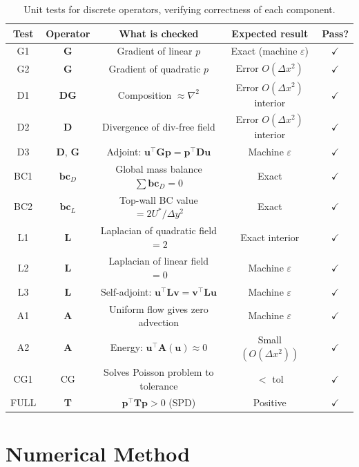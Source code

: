 \documentclass[
  aapm,
  amsmath,amssymb,
  reprint,          %
  floatfix
]{revtex4-2}
\begin{document}
\begin{table}[ht]
\centering
\caption{Unit tests for discrete operators, verifying correctness of each component.}
\begin{tabular}{ccccc}
\hline
Test & Operator & What is checked & Expected result & Pass? \\
\hline
G1 & \textbf{G} & Gradient of linear $p$ & Exact (machine $\varepsilon$) & $\checkmark$ \\
G2 & \textbf{G} & Gradient of quadratic $p$ & Error $O(\Delta x^2)$ & $\checkmark$ \\
D1 & \textbf{DG} & Composition $\approx \nabla^2$ & Error $O(\Delta x^2)$ interior & $\checkmark$ \\
D2 & \textbf{D} & Divergence of div-free field & Error $O(\Delta x^2)$ interior & $\checkmark$ \\
D3 & \textbf{D}, \textbf{G} & Adjoint: $\boldsymbol{u}^\top \textbf{G} \boldsymbol{p} = \boldsymbol{p}^\top \textbf{D} \boldsymbol{u}$ & Machine $\varepsilon$ & $\checkmark$ \\
BC1 & $\mathbf{bc}_D$ & Global mass balance $\sum \mathbf{bc}_D = 0$ & Exact & $\checkmark$ \\
BC2 & $\mathbf{bc}_L$ & Top-wall BC value $= 2U^*/\Delta y^2$ & Exact & $\checkmark$ \\
L1 & \textbf{L} & Laplacian of quadratic field $= 2$ & Exact interior & $\checkmark$ \\
L2 & \textbf{L} & Laplacian of linear field $= 0$ & Machine $\varepsilon$ & $\checkmark$ \\
L3 & \textbf{L} & Self-adjoint: $\boldsymbol{u}^\top \textbf{L} \boldsymbol{v} = \boldsymbol{v}^\top \textbf{L} \boldsymbol{u}$ & Machine $\varepsilon$ & $\checkmark$ \\
A1 & \textbf{A} & Uniform flow gives zero advection & Machine $\varepsilon$ & $\checkmark$ \\
A2 & \textbf{A} & Energy: $\boldsymbol{u}^\top \textbf{A}(\boldsymbol{u}) \approx 0$ & Small $(O(\Delta x^2))$ & $\checkmark$ \\
CG1 & CG & Solves Poisson problem to tolerance & $<$ tol & $\checkmark$ \\
FULL & \textbf{T} & $\boldsymbol{p}^\top \textbf{T} \boldsymbol{p} > 0$ (SPD) & Positive & $\checkmark$ \\
\hline
\end{tabular}
\end{table}

\section{Numerical Method}
\end{document}
